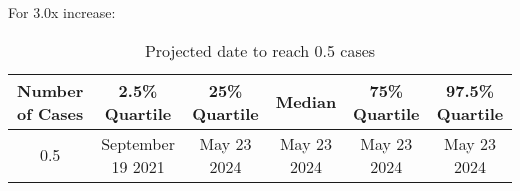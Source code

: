 For 3.0x increase:

\begin{table}[h] 
 \centering 
 \begin{tabular}{c|c|c|c|c|c}
Number of Cases & 2.5\% Quartile & 25\% Quartile & Median & 75\% Quartile & 97.5\% Quartile \\
\hline
0.5 & September 19 2021 & May 23 2024 & May 23 2024 & May 23 2024 & May 23 2024\\
\end{tabular}
\caption{Projected date to reach 0.5 cases}
\label{tab:BP_date_to_reach_cases}
\end{table}
